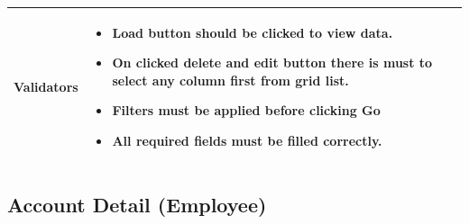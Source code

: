 \documentclass[12pt,a4paper]{article}
\begin{document}
\begin{longtable}{| p{3cm}|p{12cm}|}
Validators & 
\begin{itemize}
\item Load button should be clicked to view data.
\item   On clicked delete and edit button there is must to select any column first from grid list. 
\item  Filters must be applied before clicking Go
\item All required fields must be filled correctly. 

\end{itemize}
\\ \hline

\end{longtable}
\subsection{Account Detail (Employee) }
\end{document}
